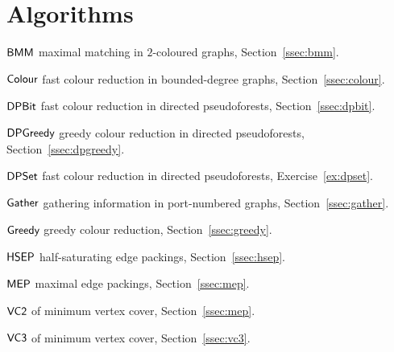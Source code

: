 \section*{Algorithms}

{\raggedright
\begin{algorithms}
    \item[$\textsf{BMM}$] maximal matching in $2$-coloured graphs, Section~\ref{ssec:bmm}.
    \item[$\textsf{Colour}$] fast colour reduction in bounded-degree graphs, Section~\ref{ssec:colour}.
    \item[$\textsf{DPBit}$] fast colour reduction in directed pseudoforests, Section~\ref{ssec:dpbit}.
    \item[$\textsf{DPGreedy}$] greedy colour reduction in directed pseudoforests, Section~\ref{ssec:dpgreedy}.
    \item[$\textsf{DPSet}$] fast colour reduction in directed pseudoforests, Exercise~\ref{ex:dpset}.
    \item[$\textsf{Gather}$] gathering information in port-numbered graphs, Section~\ref{ssec:gather}.
    \item[$\textsf{Greedy}$] greedy colour reduction, Section~\ref{ssec:greedy}.
    \item[$\textsf{HSEP}$] half-saturating edge packings, Section~\ref{ssec:hsep}.
    \item[$\textsf{MEP}$] maximal edge packings, Section~\ref{ssec:mep}.
    \item[$\textsf{VC2}$]  of minimum vertex cover, Section~\ref{ssec:mep}.
    \item[$\textsf{VC3}$]  of minimum vertex cover, Section~\ref{ssec:vc3}.
\end{algorithms}}

\renewcommand{\bibsection}{\chapter{\bibname}}



